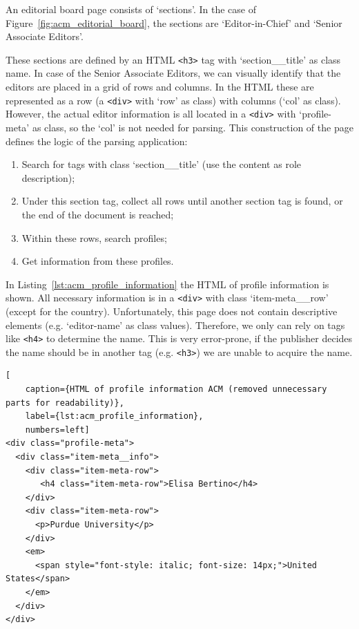 \documentclass{ou-report}
\begin{document}
An editorial board page consists of `sections'. In the case of 
Figure~\ref{fig:acm_editorial_board}, the sections are `Editor-in-Chief'
and `Senior Associate Editors'.

These sections are defined by an HTML \verb|<h3>| 
tag with `section\_\_title' as class name. In case of the Senior 
Associate Editors, we can visually identify that the editors are placed 
in a grid of rows and columns. In the HTML these are represented as a
row (a \verb|<div>| with `row' as class) with columns (`col' as class).
However, the actual editor information is all located in a \verb|<div>| 
with `profile-meta' as class, so the `col' is not needed for parsing. 
This construction of the page defines the logic of the parsing 
application:
\begin{enumerate}
    \item Search for tags with class `section\_\_title' (use the content as role description);
    \item Under this section tag, collect all rows until another section tag
    is found, or the end of the document is reached;
    \item Within these rows, search profiles;
    \item Get information from these profiles.
\end{enumerate}

In Listing~\ref{lst:acm_profile_information} the HTML of profile information
is shown. All necessary information is in a \verb|<div>| with class 
`item-meta\_\_row' (except for the country). Unfortunately, this page does
not contain descriptive elements (e.g. `editor-name' as class values).
Therefore, we only can rely on tags like \verb|<h4>| to determine the name.
This is very error-prone, if the publisher decides the name should be in another 
tag (e.g. \verb|<h3>|) we are unable to acquire the name.

\newpage
\lstset{language=HTML}
\begin{lstlisting}[
    caption={HTML of profile information ACM (removed unnecessary parts for readability)},
    label={lst:acm_profile_information},
    numbers=left]
<div class="profile-meta">
  <div class="item-meta__info">
    <div class="item-meta-row">
       <h4 class="item-meta-row">Elisa Bertino</h4>
    </div>
    <div class="item-meta-row">
      <p>Purdue University</p>
    </div>
    <em>
      <span style="font-style: italic; font-size: 14px;">United States</span>
    </em>
  </div>
</div>
\end{lstlisting}
\end{document}
